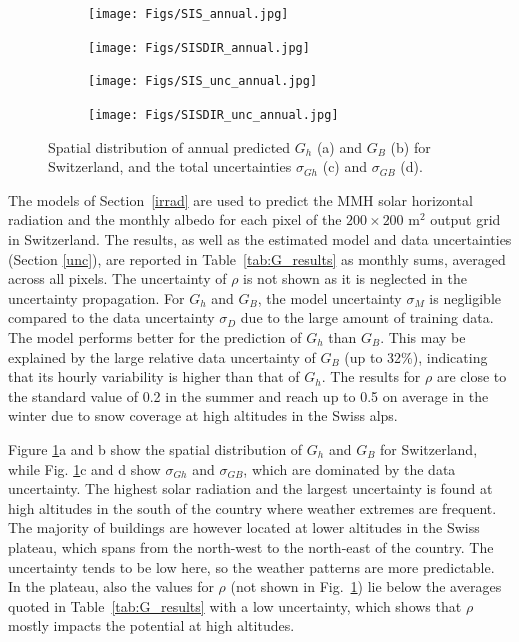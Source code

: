 \begin{figure}[tb]
\centering
\begin{subfigure}{.49\textwidth}
  \centering
  \texttt{[image: Figs/SIS\_annual.jpg]}  
  \subcaption{}
\end{subfigure}
\begin{subfigure}{.49\textwidth}
  \centering
  \texttt{[image: Figs/SISDIR\_annual.jpg]}  
  \subcaption{}
\end{subfigure}
\begin{subfigure}{.49\textwidth}
  \centering
  \texttt{[image: Figs/SIS\_unc\_annual.jpg]} 
  \subcaption{}
\end{subfigure}
\begin{subfigure}{.49\textwidth}
  \centering
  \texttt{[image: Figs/SISDIR\_unc\_annual.jpg]}  
  \subcaption{}
\end{subfigure}
\caption{Spatial distribution of annual predicted $G_h$ (a) and $G_B$ (b) for Switzerland, and the total uncertainties $\sigma_{Gh}$ (c) and $\sigma_{GB}$ (d).}
\label{fig:Gh_GB}
\end{figure}

The models of Section~\ref{irrad} are used to predict the MMH solar horizontal radiation and the monthly albedo for each pixel of the $200\times200$ m$^2$ output grid in Switzerland. 
The results, as well as the estimated model and data uncertainties (Section \ref{unc}), are reported in Table~\ref{tab:G_results} as monthly sums, averaged across all pixels. The uncertainty of $\rho$ is not shown as it is neglected in the uncertainty propagation.
For $G_h$ and $G_B$, the model uncertainty $\sigma_M$ is negligible compared to the data uncertainty $\sigma_D$ due to the large amount of training data.
The model performs better for the prediction of $G_h$ than $G_B$. This may be explained by the large relative data uncertainty of $G_B$ (up to 32\%), indicating that its hourly variability is higher than that of $G_h$. 
The results for $\rho$ are close to the standard value of 0.2 in the summer and reach up to 0.5 on average in the winter due to snow coverage at high altitudes in the Swiss alps.

Figure \ref{fig:Gh_GB}a and b show the spatial distribution of $G_h$ and $G_B$ for Switzerland, while Fig. \ref{fig:Gh_GB}c and d show $\sigma_{Gh}$ and $\sigma_{GB}$, which are dominated by the data uncertainty. The highest solar radiation and the largest uncertainty is found at high altitudes in the south of the country where weather extremes are frequent. The majority of buildings are however located at lower altitudes in the Swiss plateau, which spans from the north-west to the north-east of the country. The uncertainty tends to be low here, so the weather patterns are more predictable. In the plateau, also the values for $\rho$ (not shown in Fig.~\ref{fig:Gh_GB}) lie below the averages quoted in Table~\ref{tab:G_results} with a low uncertainty, which shows that $\rho$ mostly impacts the potential at high altitudes.

